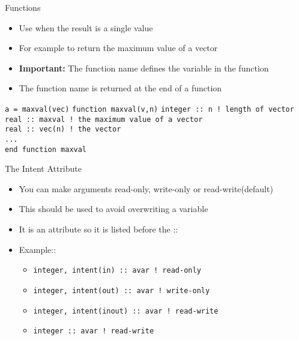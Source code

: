 \documentclass{beamer}
\begin{document}
\begin{frame}{Functions}

  \begin{itemize}
    \item Use when the result is a single value
    \vfill\item For example to return the maximum value of a vector
    \vfill\item \textbf{Important:} The function name defines the variable in the function
    \vfill\item The function name is returned at the end of a function
  \end{itemize}
  \vfill
  \texttt{a = maxval(vec)}
  \vfill
  \texttt{function maxval(v,n)}
  \hspace{0.1cm} \texttt{integer :: n ! length of vector} \\
  \hspace{0.1cm} \texttt{real :: maxval ! the maximum value of a vector} \\
  \hspace{0.1cm} \texttt{real :: vec(n) ! the vector} \\
  \hspace{0.1cm} \texttt{...} \\
  \texttt{end function maxval}

\end{frame}
\begin{frame}{The Intent Attribute}

  \begin{itemize}
    \item You can make arguments read-only, write-only or read-write(default)
    \vfill\item This should be used to avoid overwriting a variable
    \vfill\item It is an attribute so it is listed before the ::
    \vfill\item Example::
      \begin{itemize}
	\item \texttt{integer, intent(in) :: avar ! read-only}
	\item \texttt{integer, intent(out) :: avar ! write-only}
	\item \texttt{integer, intent(inout) :: avar ! read-write}
	\item \texttt{integer :: avar ! read-write}
      \end{itemize}
  \end{itemize}

\end{frame}
\end{document}
